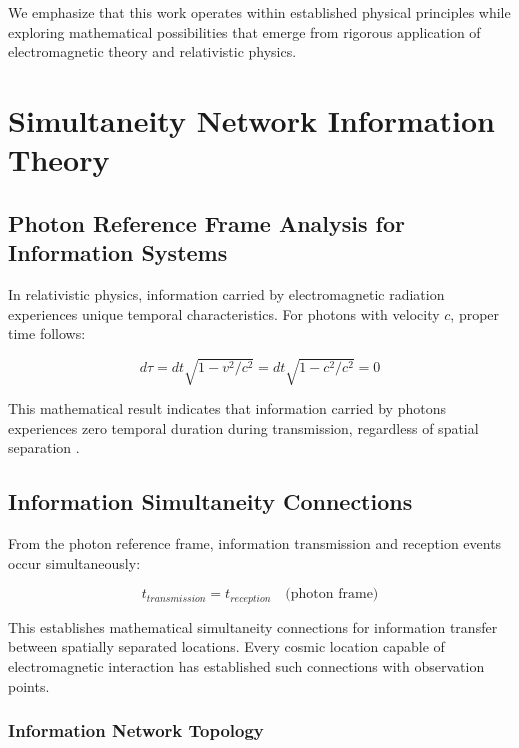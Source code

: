 \documentclass[12pt,a4paper]{article}
\begin{document}
We emphasize that this work operates within established physical principles while exploring mathematical possibilities that emerge from rigorous application of electromagnetic theory and relativistic physics.

\section{Simultaneity Network Information Theory}

\subsection{Photon Reference Frame Analysis for Information Systems}

In relativistic physics, information carried by electromagnetic radiation experiences unique temporal characteristics. For photons with velocity $c$, proper time follows:

\begin{equation}
d\tau = dt\sqrt{1-v^2/c^2} = dt\sqrt{1-c^2/c^2} = 0
\label{eq:photon_proper_time_info}
\end{equation}

This mathematical result indicates that information carried by photons experiences zero temporal duration during transmission, regardless of spatial separation \cite{rindler2001introduction}.

\subsection{Information Simultaneity Connections}

From the photon reference frame, information transmission and reception events occur simultaneously:

\begin{equation}
t_{transmission} = t_{reception} \quad \text{(photon frame)}
\label{eq:info_simultaneity}
\end{equation}

This establishes mathematical simultaneity connections for information transfer between spatially separated locations. Every cosmic location capable of electromagnetic interaction has established such connections with observation points.

\subsubsection{Information Network Topology}
\end{document}
